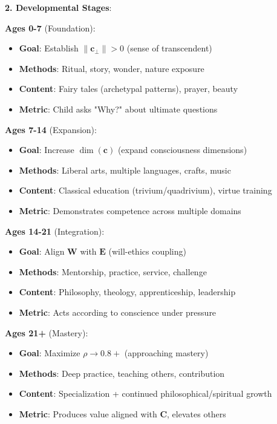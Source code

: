 \documentclass[11pt,a4paper]{article}
\theoremstyle{definition}
\theoremstyle{remark}
\newcommand{\EE}{\mathbf{E}}
\newcommand{\WW}{\mathbf{W}}
\newcommand{\cc}{\mathbf{c}}
\begin{document}
\begin{small}
\begin{enumerate}
\begin{protocol}
\begin{protocol}
\textbf{2. Developmental Stages}:

\textbf{Ages 0-7} (Foundation):
\begin{itemize}
    \item \textbf{Goal}: Establish \(\|\cc_\perp\| > 0\) (sense of transcendent)
    \item \textbf{Methods}: Ritual, story, wonder, nature exposure
    \item \textbf{Content}: Fairy tales (archetypal patterns), prayer, beauty
    \item \textbf{Metric}: Child asks "Why?" about ultimate questions
\end{itemize}

\textbf{Ages 7-14} (Expansion):
\begin{itemize}
    \item \textbf{Goal}: Increase \(\dim(\cc)\) (expand consciousness dimensions)
    \item \textbf{Methods}: Liberal arts, multiple languages, crafts, music
    \item \textbf{Content}: Classical education (trivium/quadrivium), virtue training
    \item \textbf{Metric}: Demonstrates competence across multiple domains
\end{itemize}

\textbf{Ages 14-21} (Integration):
\begin{itemize}
    \item \textbf{Goal}: Align \(\WW\) with \(\EE\) (will-ethics coupling)
    \item \textbf{Methods}: Mentorship, practice, service, challenge
    \item \textbf{Content}: Philosophy, theology, apprenticeship, leadership
    \item \textbf{Metric}: Acts according to conscience under pressure
\end{itemize}

\textbf{Ages 21+} (Mastery):
\begin{itemize}
    \item \textbf{Goal}: Maximize \(\rho \to 0.8+\) (approaching mastery)
    \item \textbf{Methods}: Deep practice, teaching others, contribution
    \item \textbf{Content}: Specialization + continued philosophical/spiritual growth
    \item \textbf{Metric}: Produces value aligned with \(\mathbf{C}\), elevates others
\end{itemize}


\end{protocol}
\end{protocol}
\end{enumerate}
\end{small}
\end{document}
